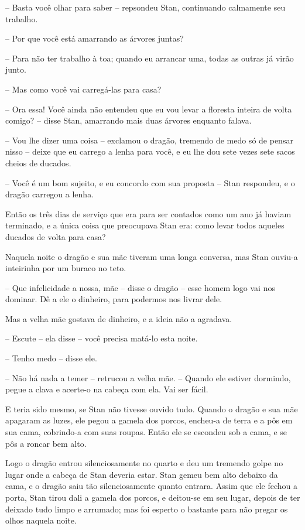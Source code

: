 -- Basta você olhar para saber -- repsondeu Stan, continuando calmamente
seu trabalho.

-- Por que você está amarrando as árvores juntas?

-- Para não ter trabalho à toa; quando eu arrancar uma, todas as outras
já virão junto. 

-- Mas como você vai carregá-las para casa?

-- Ora essa! Você ainda não entendeu que eu vou levar a floresta
inteira de volta comigo? -- disse Stan, amarrando mais duas árvores
enquanto falava.

-- Vou lhe dizer uma coisa -- exclamou o dragão, tremendo de medo só de
pensar nisso -- deixe que eu carrego a lenha para você, e eu lhe dou
sete vezes sete sacos cheios de ducados.

-- Você é um bom sujeito, e eu concordo com sua proposta -- Stan
respondeu, e o dragão carregou a lenha.

Então os três dias de serviço que era para ser contados como um ano já
haviam terminado, e a única coisa que preocupava Stan era: como levar
todos aqueles ducados de volta para casa?

Naquela noite o dragão e sua mãe tiveram uma longa conversa, mas Stan
ouviu-a inteirinha por um buraco no teto.

-- Que infelicidade a nossa, mãe -- disse o dragão -- esse homem logo vai
nos dominar. Dê a ele o dinheiro, para podermos nos livrar dele.

Mas a velha mãe gostava de dinheiro, e a ideia não a agradava.

-- Escute -- ela disse -- você precisa matá-lo esta noite.

-- Tenho medo -- disse ele.

-- Não há nada a temer -- retrucou a velha mãe. -- Quando ele estiver
dormindo, pegue a clava e acerte-o na cabeça com ela. Vai ser fácil.

E teria sido mesmo, se Stan não tivesse ouvido tudo. Quando o dragão e
sua mãe apagaram as luzes, ele pegou a gamela dos porcos, encheu-a de
terra e a pôs em sua cama, cobrindo-a com suas roupas. Então ele se
escondeu sob a cama, e se pôs a roncar bem alto.

Logo o dragão entrou silenciosamente no quarto e deu um tremendo golpe
no lugar onde a cabeça de Stan deveria estar. Stan gemeu bem alto
debaixo da cama, e o dragão saiu tão silenciosamente quanto entrara.
Assim que ele fechou a porta, Stan tirou dali a gamela dos porcos, e
deitou-se em seu lugar, depois de ter deixado tudo limpo e arrumado;
mas foi esperto o bastante para não pregar os olhos naquela noite.

